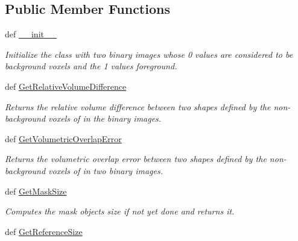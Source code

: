 \subsection*{Public Member Functions}
\begin{DoxyCompactItemize}
\item 
def \hyperlink{classmedpy_1_1metric_1_1Volume_1_1Volume_acd9bb57619003117d40ddb45059f160d}{\_\-\_\-init\_\-\_\-}
\begin{DoxyCompactList}\small\item\em Initialize the class with two binary images whose 0 values are considered to be background voxels and the 1 values foreground. \end{DoxyCompactList}\item 
def \hyperlink{classmedpy_1_1metric_1_1Volume_1_1Volume_a0432d5eeea15c24f159ab0c7737be4ad}{GetRelativeVolumeDifference}
\begin{DoxyCompactList}\small\item\em Returns the relative volume difference between two shapes defined by the non-\/background voxels of in the binary images. \end{DoxyCompactList}\item 
def \hyperlink{classmedpy_1_1metric_1_1Volume_1_1Volume_ac9520b102a7355e1c3b1e6e7338f8d1d}{GetVolumetricOverlapError}
\begin{DoxyCompactList}\small\item\em Returns the volumetric overlap error between two shapes defined by the non-\/background voxels of in two binary images. \end{DoxyCompactList}\item 
\hypertarget{classmedpy_1_1metric_1_1Volume_1_1Volume_a2b74258c665afe8c9fb75d81539b2072}{
def \hyperlink{classmedpy_1_1metric_1_1Volume_1_1Volume_a2b74258c665afe8c9fb75d81539b2072}{GetMaskSize}}
\label{classmedpy_1_1metric_1_1Volume_1_1Volume_a2b74258c665afe8c9fb75d81539b2072}

\begin{DoxyCompactList}\small\item\em Computes the mask objects size if not yet done and returns it. \end{DoxyCompactList}\item 
\hypertarget{classmedpy_1_1metric_1_1Volume_1_1Volume_a9b83c53e0f5742f89e9e42fb91fde96f}{
def \hyperlink{classmedpy_1_1metric_1_1Volume_1_1Volume_a9b83c53e0f5742f89e9e42fb91fde96f}{GetReferenceSize}}
\label{classmedpy_1_1metric_1_1Volume_1_1Volume_a9b83c53e0f5742f89e9e42fb91fde96f}


\end{DoxyCompactItemize}
